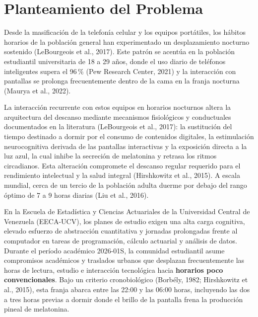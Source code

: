 \documentclass[12pt, letterpaper]{article}
\begin{document}
\setcounter{page}{1}
\setcounter{section}{1} %


\section{Planteamiento del Problema}

Desde la masificación de la telefonía celular y los equipos portátiles, los hábitos horarios de la población general han experimentado un desplazamiento nocturno sostenido (LeBourgeois et al., 2017). Este patrón se acentúa en la población estudiantil universitaria de 18 a 29 años, donde el uso diario de teléfonos inteligentes supera el 96\,\% (Pew Research Center, 2021) y la interacción con pantallas se prolonga frecuentemente dentro de la cama en la franja nocturna (Maurya et al., 2022).

La interacción recurrente con estos equipos en horarios nocturnos altera la arquitectura del descanso mediante mecanismos fisiológicos y conductuales documentados en la literatura (LeBourgeois et al., 2017): la sustitución del tiempo destinado a dormir por el consumo de contenidos digitales, la estimulación neurocognitiva derivada de las pantallas interactivas y la exposición directa a la luz azul, la cual inhibe la secreción de melatonina y retrasa los ritmos circadianos. Esta alteración compromete el descanso regular requerido para el rendimiento intelectual y la salud integral (Hirshkowitz et al., 2015). A escala mundial, cerca de un tercio de la población adulta duerme por debajo del rango óptimo de 7 a 9 horas diarias (Liu et al., 2016).

En la Escuela de Estadística y Ciencias Actuariales de la Universidad Central de Venezuela (EECA-UCV), los planes de estudio exigen una alta carga cognitiva, elevado esfuerzo de abstracción cuantitativa y jornadas prolongadas frente al computador en tareas de programación, cálculo actuarial y análisis de datos. Durante el período académico 2026-01S, la comunidad estudiantil asume compromisos académicos y traslados urbanos que desplazan frecuentemente las horas de lectura, estudio e interacción tecnológica hacia \textbf{horarios poco convencionales}. Bajo un criterio cronobiológico (Borbély, 1982; Hirshkowitz et al., 2015), esta franja abarca entre las 22:00 y las 06:00 horas, incluyendo las dos a tres horas previas a dormir donde el brillo de la pantalla frena la producción pineal de melatonina.
\end{document}
